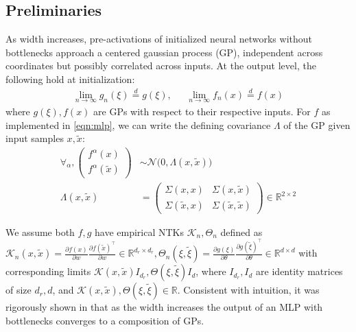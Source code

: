 \documentclass{article}
\theoremstyle{definition}
\theoremstyle{remark}
\renewcommand{\[}{\begin{eqnarray}}
\renewcommand{\]}{\end{eqnarray}}
\renewcommand{\[}{\begin{eqnarray}}
\renewcommand{\]}{\end{eqnarray}}
\newcommand{\R}{\mathbb{R}}
\newcommand{\F}{\mathcal{F}}
\newcommand{\E}{\mathbb{E}}
\begin{document}
\subsection{Preliminaries}\label{sec:pre}
As width increases, pre-activations of initialized neural networks without bottlenecks approach a centered gaussian process (GP), independent across coordinates but possibly correlated across inputs. At the output level, the following hold at initialization:
\begin{align}\label{eqn:nngp}
\lim_{n \to \infty} g_n(\xi) \overset{d}{=} g(\xi),&~~~ \lim_{n \to \infty} f_n(x) \overset{d}{=} f(x)
\end{align}
where $g(\xi),f(x)$ are GPs with respect to their respective inputs. For $f$ as implemented in \cref{eqn:mlp}, we can write the defining covariance $\Lambda$ of the GP given input samples $x,\tilde{x}$:
\begin{align}
\forall_\alpha,\begin{pmatrix}
f^\alpha(x)\\
f^\alpha(\tilde{x}) 
\end{pmatrix} &\sim \mathcal{N}\big(0, \Lambda(x,\tilde{x})\big)\\
\Lambda(x,\tilde{x}) &= \begin{pmatrix} \Sigma(x,x) & \Sigma(x,\tilde{x})\\ \Sigma(\tilde{x},x) & \Sigma(\tilde{x},\tilde{x}) \end{pmatrix} \in \R^{2 \times 2}
\end{align}

We assume both $f,g$ have empirical NTKs $\mathcal{K}_n ,\Theta_n$ defined as $\mathcal{K}_n(x,\tilde{x}) = \frac{\partial f(x)}{\partial w}\frac{\partial  f(\tilde{x})^\top}{\partial w} \in \R^{d_r \times d_r},\Theta_n(\xi,\tilde{\xi}) = \frac{\partial g(\xi)}{\partial \theta}\frac{\partial g(\tilde{\xi})^\top}{\partial \theta} \in \R^{d \times d}$
with corresponding limits $\mathcal{K}(x,\tilde{x})I_{d_r}, \Theta(\xi,\tilde{\xi})I_{d}$, where $I_{d_r},I_d$ are identity matrices of size $d_r,d$, and $\mathcal{K}(x,\tilde{x}),\Theta(\xi,\tilde{\xi}) \in \R$.
Consistent with intuition, it was rigorously shown in \cite{Agrawal2020WideNN} that as the width increases the output of an MLP with bottlenecks converges to a composition of GPs. \\
\end{document}
